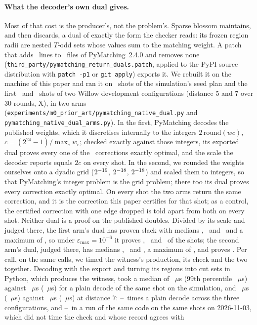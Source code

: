 \documentclass[aps,pra,twocolumn,superscriptaddress,nofootinbib,longbibliography,floatfix]{revtex4-2}
\newcommand{\eps}{\varepsilon}
\newcommand{\T}{T}
\begin{document}
\paragraph*{What the decoder's own dual gives.} Most of that cost is the producer's, not the problem's. Sparse blossom maintains, and then discards, a dual of exactly the form the checker reads: its frozen region radii are nested $\T$-odd sets whose values sum to the matching weight. A patch that adds \NdPatchAdded\ lines to \NdPatchFiles\ files of PyMatching~2.4.0 and removes none (\nolinkurl{third_party/pymatching_return_duals.patch}, applied to the PyPI source distribution with \texttt{patch -p1} or \texttt{git apply}) exports it. We rebuilt it on the machine of this paper and ran it on \NdSimN\ shots of the simulation's seed plan and the first \NdWFiveN\ and \NdWSevenN\ shots of two Willow development configurations (distance 5 and 7 over 30 rounds, X), in two arms (\nolinkurl{experiments/m0_prior_art/pymatching_native_dual.py} and \nolinkurl{pymatching_native_dual_arms.py}). In the first, PyMatching decodes the published weights, which it discretises internally to the integers $2\,\mathrm{round}(w c)$, $c=(2^{24}-1)/\max_e w_e$; checked exactly against those integers, its exported dual proves every one of the \NdIntShots\ corrections exactly optimal, and the scale the decoder reports equals $2c$ on every shot. In the second, we rounded the weights ourselves onto a dyadic grid ($2^{-19}$, $2^{-18}$, $2^{-18}$) and scaled them to integers, so that PyMatching's integer problem is the grid problem; there too its dual proves every correction exactly optimal. On every shot the two arms return the same correction, and it is the correction this paper certifies for that shot; as a control, the certified correction with one edge dropped is told apart from both on every shot. Neither dual is a proof on the published doubles. Divided by its scale and judged there, the first arm's dual has proven slack with medians \NdSimRawEpsMedian, \NdWFiveRawEpsMedian\ and \NdWSevenRawEpsMedian\ and a maximum of \NdRawEpsMaxAll, so under $\eps_{\max}=10^{-6}$ it proves \NdSimRawProven, \NdWFiveRawProven\ and \NdWSevenRawProven\ of the shots; the second arm's dual, judged there, has medians \NdSimGridOnRawEpsMedian, \NdWFiveGridOnRawEpsMedian\ and \NdWSevenGridOnRawEpsMedian, a maximum of \NdGridOnRawEpsMaxAll, and proves \NdGridOnRawProvenTotal. Per call, on the same calls, we timed the witness's production, its check and the two together. Decoding with the export and turning its regions into cut sets in Python, which produces the witness, took a median of \NdSimDualConvUs~$\mu$s (99th percentile \NdSimDualConvPNinetyNineUs~$\mu$s) against \NdSimPlainUs~$\mu$s (\NdSimPlainPNinetyNineUs~$\mu$s) for a plain decode of the same shot on the simulation, and \NdWSevenDualConvUs~$\mu$s (\NdWSevenDualConvPNinetyNineUs~$\mu$s) against \NdWSevenPlainUs~$\mu$s (\NdWSevenPlainPNinetyNineUs~$\mu$s) at distance 7: \NdCallRatioLo--\NdCallRatioHi\ times a plain decode across the three configurations, and \NdCallRatioEarlierLo--\NdCallRatioEarlierHi\ in a run of the same code on the same shots on 2026-11-03, which did not time the check and whose record agrees with 
\end{document}
